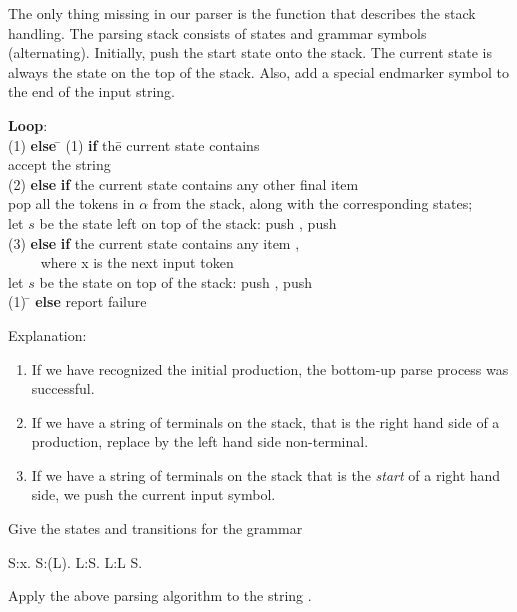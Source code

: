 The only thing missing in our parser is the function that describes
the stack handling.
The parsing stack consists of states and grammar symbols
(alternating).  Initially, push the start state onto the stack.  The
current state is always the state on the top of the stack.  Also, add
a special endmarker symbol to the end of the input string.

\begin{tabbing}
\textbf{Loop}:\\
(1) \textbf{else} \=\kill
(1) \textbf{if} \>th\=e current state contains \\
\>\>accept the string\\
(2) \textbf{else} \>\textbf{if} the current state %
    contains any other final item \\
\>\>pop all the tokens in $\alpha$ from the stack, %
    along with the corresponding states; \\
\>\>let $s$ be the state left on top of the stack: %
    push , push \\
(3) \textbf{else} \>\textbf{if} the current state contains any item %
    ,\\
\>\>$\qquad$ where x is the next input token\\
\>\>let $s$ be the state on top of the stack: %
    push , push \\
(1) \=\kill
\>\textbf{else} report failure
\end{tabbing}
Explanation:
\begin{enumerate}
\item If we have recognized the initial production, the bottom-up
  parse process was successful.
\item If we have a string of terminals on the stack, that is the right
  hand side of a production, replace by the left hand side
  non-terminal.
\item If we have a string of terminals on the stack that is the
  \emph{start} of a right hand side, we push the current input symbol.
\end{enumerate}

\begin{594exercise}
Give the states and transitions for the grammar
\begin{bnf}
S:x.
S:(L).
L:S.
L:L S.
\end{bnf}
Apply the above parsing algorithm to the string .
\end{594exercise}

